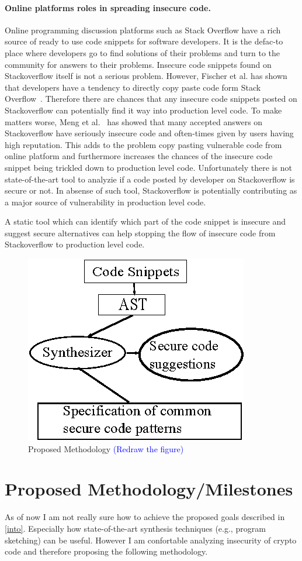 \documentclass[sigconf]{acmart}
\begin{document}
\paragraph{Online platforms roles in spreading insecure code.} Online programming discussion platforms such as Stack Overflow have a rich source of ready to use code snippets for software developers. It is the defac-to place where developers go to find solutions of their problems and turn to the community for answers to their problems. 
Insecure code snippets found on Stackoverflow itself is not a serious problem. However,  
Fischer et al. has shown that developers have a tendency to directly copy paste code form Stack Overflow~\cite{fischer2017stack}. Therefore there are chances that any insecure code snippets posted on Stackoverflow can potentially find it way into production level code. To make matters worse, Meng et al.~\cite{meng2018secure} has showed that many accepted answers on Stackoverflow have seriously insecure code and often-times given by users having high reputation. This adds to the problem copy pasting vulnerable code from online platform and furthermore increases the chances of the insecure code snippet being trickled down to production level code. 
Unfortunately there is not state-of-the-art tool to analyzie if a code posted by developer on Stackoverflow is secure or not. In absense of such tool, Stackoverflow is potentially contributing as a major source of vulnerability in production level code.  

A static tool which can identify which part of the code snippet is insecure and suggest secure alternatives can help stopping the flow of insecure code from Stackoverflow to production level code.
\begin{figure}
  \includegraphics[width=0.5\linewidth]{Figures/workflow.eps}
  \caption{Proposed Methodology \textcolor{blue}{(Redraw the figure)}}
\end{figure}
\section{Proposed Methodology/Milestones}
As of now I am not really sure how to achieve the proposed goals described in \cref{into}. Especially how state-of-the-art synthesis techniques (e.g., program sketching) can be useful. However I am confortable analyzing insecurity of crypto code and therefore proposing the following methodology. 
\end{document}
